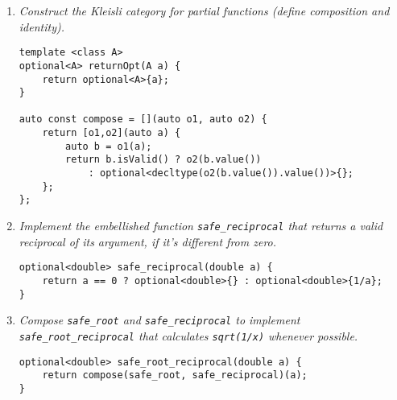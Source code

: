 \documentclass[11pt]{article}
\begin{document}
\begin{enumerate}
\item \textit{Construct the Kleisli category for partial functions (define composition and identity).}

\begin{lstlisting}
template <class A>
optional<A> returnOpt(A a) {
	return optional<A>{a};
}

auto const compose = [](auto o1, auto o2) {
	return [o1,o2](auto a) {
		auto b = o1(a);
		return b.isValid() ? o2(b.value())
			: optional<decltype(o2(b.value()).value())>{};
	};
};
\end{lstlisting}

\item \textit{Implement the embellished function \texttt{safe\_reciprocal} that returns a valid reciprocal of its argument, if it's different from zero.}

\begin{lstlisting}
optional<double> safe_reciprocal(double a) {
	return a == 0 ? optional<double>{} : optional<double>{1/a};
}
\end{lstlisting}

\item \textit{Compose \texttt{safe\_root} and \texttt{safe\_reciprocal} to implement \texttt{safe\_root\_reciprocal} that calculates \texttt{sqrt(1/x)} whenever possible.}
\begin{lstlisting}
optional<double> safe_root_reciprocal(double a) {
	return compose(safe_root, safe_reciprocal)(a);
}
\end{lstlisting}
\end{enumerate}
\end{document}
